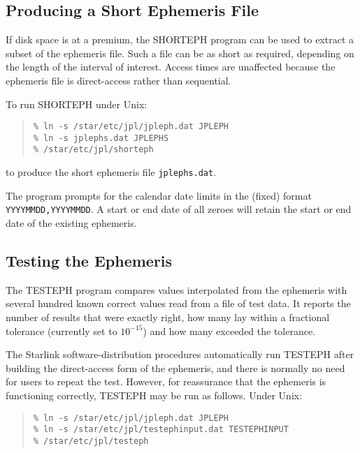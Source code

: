 \documentclass[twoside,11pt]{article}
\newcommand{\xlabel}[1]{}
\renewcommand{\_}{\texttt{\symbol{95}}}
\begin{document}
\subsection{\xlabel{producing_a_short_ephemeris_file}Producing a Short Ephemeris File}
\label{producing_a_short_ephemeris_file}

If disk space is at a premium, the SHORTEPH program can be used to
extract a subset of the ephemeris file.  Such a file can be as short
as required, depending on the length of the interval of interest.
Access times are unaffected because the ephemeris file is direct-access
rather than sequential.

To run SHORTEPH under Unix:

\begin{quote}
\begin{verbatim}
% ln -s /star/etc/jpl/jpleph.dat JPLEPH
% ln -s jplephs.dat JPLEPHS
% /star/etc/jpl/shorteph
\end{verbatim}
\end{quote}

to produce the short ephemeris file \texttt{jplephs.dat}.

The program prompts for the calendar date limits in the (fixed) format
\texttt{YYYYMMDD,YYYYMMDD}.  A start or end date of all zeroes will
retain the start or end date of the existing ephemeris.

\subsection{\xlabel{testing_the_ephemeris}Testing the Ephemeris}
\label{testing_the_ephemeris}

The TESTEPH program compares values interpolated from the ephemeris
with several hundred known correct values read from a file of test data.
It reports the number of results that were exactly right, how many lay
within a fractional tolerance (currently set to $10^{-15}$) and how many
exceeded the tolerance.

The Starlink software-distribution procedures automatically run
TESTEPH after building the direct-access form of the ephemeris, and
there is normally no need for users to repeat the test.  However, for
reassurance that the ephemeris is functioning correctly, TESTEPH may be
run as follows.  Under Unix:

\begin{quote}
\begin{verbatim}
% ln -s /star/etc/jpl/jpleph.dat JPLEPH
% ln -s /star/etc/jpl/testephinput.dat TESTEPHINPUT
% /star/etc/jpl/testeph
\end{verbatim}
\end{quote}
\end{document}
